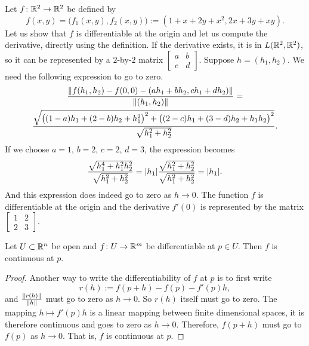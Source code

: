 \begin{example}
Let $f \colon {\mathbb{R}}^2 \to {\mathbb{R}}^2$ be defined by
\begin{equation*}
f(x,y) = \bigl(f_1(x,y),f_2(x,y)\bigr) := (1+x+2y+x^2,2x+3y+xy).
\end{equation*}
Let us show that $f$ is differentiable at the origin and let us 
compute the derivative,
directly using the definition.  If the
derivative exists, it is in $L({\mathbb{R}}^2,{\mathbb{R}}^2)$, so it can be
represented by a $2$-by-$2$ matrix
$\left[\begin{smallmatrix}a&b\\c&d\end{smallmatrix}\right]$.  Suppose $h =
(h_1,h_2)$.  We need the following expression to go to zero.
\begin{multline*}
\frac{\lVert {
f(h_1,h_2)-f(0,0)
-
(ah_1 +bh_2 , ch_1+dh_2)} \rVert
}{\lVert {(h_1,h_2)} \rVert}
=
\\
\frac{\sqrt{
{\bigl((1-a)h_1 + (2-b)h_2 + h_1^2\bigr)}^2
+
{\bigl((2-c)h_1 + (3-d)h_2 + h_1h_2\bigr)}^2}}{\sqrt{h_1^2+h_2^2}} .
\end{multline*}
If we choose $a=1$, $b=2$, $c=2$, $d=3$, the expression becomes
\begin{equation*}
\frac{\sqrt{
h_1^4 + h_1^2h_2^2}}{\sqrt{h_1^2+h_2^2}}
=
\lvert {h_1} \rvert
\frac{\sqrt{
h_1^2 + h_2^2}}{\sqrt{h_1^2+h_2^2}}
= \lvert {h_1} \rvert .
\end{equation*}
And this expression does indeed go to zero as $h \to 0$.  The
function $f$ is differentiable at the origin and 
the derivative $f'(0)$ is represented by the matrix
$\left[\begin{smallmatrix}1&2\\2&3\end{smallmatrix}\right]$.
\end{example}

\begin{prop}
Let $U \subset {\mathbb{R}}^n$ be open and $f \colon U \to {\mathbb{R}}^m$ be
differentiable at $p \in U$.  Then $f$ is continuous at $p$.
\end{prop}

\begin{proof}
Another way to write the differentiability of $f$ at $p$ is to first write
\begin{equation*}
r(h) := f(p+h)-f(p) - f'(p) h ,
\end{equation*}
and $\frac{\lVert {r(h)} \rVert}{\lVert {h} \rVert}$ must go to zero as $h \to 0$.
So
$r(h)$ itself must go to zero.  The mapping $h \mapsto f'(p) h$
is a linear mapping between finite dimensional spaces, it is
therefore continuous
and goes to zero as $h \to 0$.  Therefore,
$f(p+h)$ must go to $f(p)$ as $h \to 0$.  That is, $f$ is continuous at $p$.
\end{proof}

